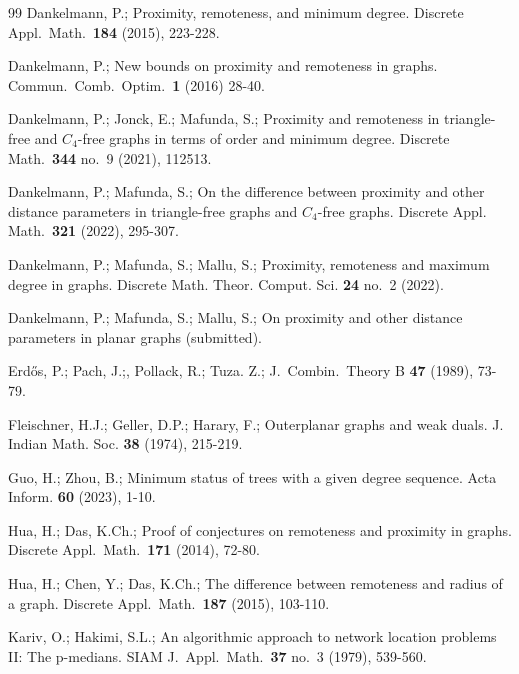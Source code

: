 \documentclass[a4paper,11pt]{article}
\numberwithin{equation}{theorem}
\begin{document}
\begin{thebibliography}{99}
 Dankelmann, P.; Proximity, remoteness, and minimum degree. Discrete Appl.\ Math.\ {\bf 184} (2015), 223-228.  

 Dankelmann, P.; New bounds on proximity and remoteness in graphs. 
Commun.\ Comb.\ Optim.\  {\bf 1} (2016) 28-40.     
    
  Dankelmann, P.; Jonck, E.; Mafunda, S.; Proximity and remoteness in triangle-free and $C_4$-free graphs in terms of order and minimum degree. Discrete Math.\ {\bf 344} no.\ 9 (2021), 112513.
      
  Dankelmann, P.; Mafunda, S.; On the difference between proximity and other distance parameters in triangle-free graphs and $C_4$-free graphs. Discrete Appl. Math.\ {\bf 321} (2022), 295-307.   

  Dankelmann, P.; Mafunda, S.; Mallu, S.; 
Proximity, remoteness and maximum degree in graphs. 
Discrete Math. Theor. Comput. Sci. {\bf 24} no.\ 2 (2022).

 Dankelmann, P.; Mafunda, S.; Mallu, S.; 
On proximity and other distance parameters in planar graphs (submitted).

 Erd\H{o}s, P.; Pach, J.;, Pollack, R.; Tuza. Z.; 
J.\ Combin.\ Theory B {\bf 47} (1989), 73-79. 
     
 Fleischner, H.J.; Geller, D.P.; Harary, F.; Outerplanar graphs and weak duals. J. Indian Math. Soc. {\bf 38} (1974), 215-219.

 Guo, H.; Zhou, B.; 
Minimum status of trees with a given degree sequence.
Acta Inform. {\bf 60} (2023), 1-10.  
      
  Hua, H.;  Das, K.Ch.; Proof of conjectures on remoteness and proximity in graphs. Discrete Appl.\ Math.\ {\bf 171} (2014), 72-80.  

 Hua, H.; Chen, Y.;  Das, K.Ch.; The difference between remoteness and radius of a graph. Discrete Appl.\ Math.\ {\bf 187} (2015), 103-110.   
   
   
 Kariv, O.; Hakimi, S.L.; An algorithmic approach to network location problems II: The p-medians. SIAM J.\ Appl.\ Math.\ {\bf 37} no.\ 3 (1979), 539-560. 


\end{thebibliography}
\end{document}
